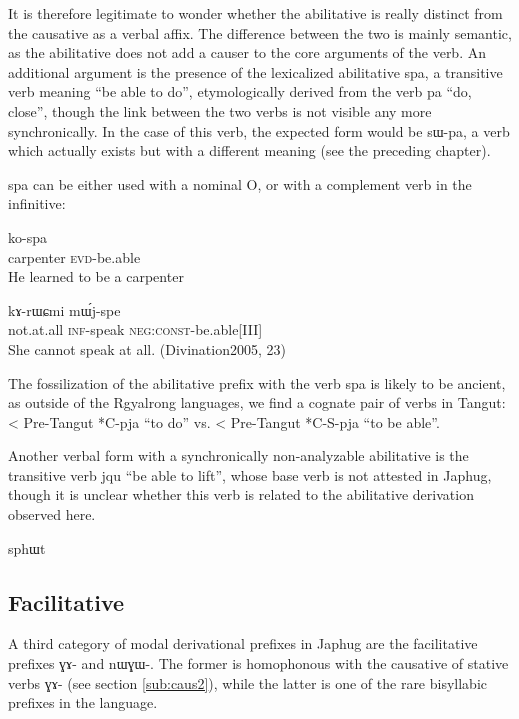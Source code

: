 \documentclass[oldfontcommands,oneside,a4paper,11pt]{memoir}
\newcommand{\ipa}[1]{{\phon #1}} %
\newcommand{\const}{\textsc{const}}
\newcommand{\evd}{\textsc{evd}}
\newcommand{\inftv}{\textsc{inf}}
\newcommand{\negat}{\textsc{neg}}
\begin{document}
It is therefore legitimate to wonder whether the abilitative is really distinct from the causative as a verbal affix. The difference between the two  is mainly semantic, as the abilitative does not add a causer to the core arguments of the verb. An additional argument is the presence of the lexicalized abilitative \ipa{spa}, a transitive verb meaning ``be able to do'', etymologically derived from the verb \ipa{pa} ``do, close'', though the link between the two verbs is not visible any more synchronically. In the case of this verb, the expected form would be \ipa{sɯ-pa}, a verb which actually exists but with a different meaning (see the preceding chapter). 

\ipa{spa} can be either used with a nominal O, or with a complement verb in the infinitive:
 \begin{exe}
\ex 
\gll  	     \ipa{ɕoŋβzu} \ipa{ko-spa} \\
    carpenter  \evd{}-be.able  \\
 \glt  He learned to be a carpenter  
   \end{exe}
 \begin{exe}
\ex 
\gll  	 \ipa{maka}   \ipa{kɤ-rɯɕmi} \ipa{mɯ́j-spe} \\
   not.at.all \inftv{}-speak \negat{}:\const{}-be.able[III] \\
 \glt She cannot speak at all. (Divination2005, 23) 
   \end{exe}


The fossilization of the abilitative prefix with the verb \ipa{spa} is likely to be ancient, as outside of the Rgyalrong languages, we find a cognate pair of verbs in Tangut: 
 < Pre-Tangut *C-pja ``to do'' vs.  < Pre-Tangut *C-S-pja ``to be able''. 
 
Another verbal form with a synchronically non-analyzable abilitative is the transitive verb \ipa{jqu} ``be able to lift'', whose base verb is not attested in Japhug, though it is unclear whether this verb is related to the abilitative derivation observed here.

sphɯt
 
\subsection{Facilitative} \label{sub:facilitative}
A third category of modal derivational prefixes in Japhug are the facilitative prefixes \ipa{ɣɤ-} and \ipa{nɯɣɯ-}. The former is homophonous with the causative of stative verbs \ipa{ɣɤ-} (see section \ref{sub:caus2}), while the latter is one of the rare bisyllabic prefixes in the language.
\end{document}
